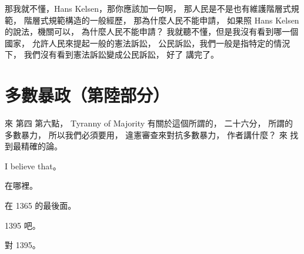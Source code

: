 \hypertarget{w06:cue:2940}{}那我就不懂，Hans Kelsen，那你應該加一句啊，
\hypertarget{w06:cue:2941}{}那人民是不是也有維護階層式規範，
\hypertarget{w06:cue:2942}{}階層式規範構造的一般經歷，
\hypertarget{w06:cue:2943}{}那為什麼人民不能申請，
\hypertarget{w06:cue:2944}{}如果照 Hans Kelsen 的說法，機關可以，
\hypertarget{w06:cue:2945}{}為什麼人民不能申請？
\hypertarget{w06:cue:2946}{}我就聽不懂，但是我沒有看到哪一個國家，
\hypertarget{w06:cue:2947}{}允許人民來提起一般的憲法訴訟，
\hypertarget{w06:cue:2948}{}公民訴訟，我們一般是指特定的情況下，
\hypertarget{w06:cue:2949}{}我們沒有看到憲法訴訟變成公民訴訟，
\hypertarget{w06:cue:2950}{}好了 講完了。

\section{多數暴政（第陸部分）}

\hypertarget{w06:cue:2951}{}來 第四 第六點，
\hypertarget{w06:cue:2952}{}Tyranny of Majority
\hypertarget{w06:cue:2953}{}有關於這個所謂的，
\hypertarget{w06:cue:2954}{}二十六分，
\hypertarget{w06:cue:2955}{}所謂的多數暴力，
\hypertarget{w06:cue:2956}{}所以我們必須要用，
\hypertarget{w06:cue:2957}{}違憲審查來對抗多數暴力，
\hypertarget{w06:cue:2958}{}作者講什麼？
\hypertarget{w06:cue:2959}{}來 找到最精確的論。

\hypertarget{w06:cue:2960}{}I believe that。

\hypertarget{w06:cue:2961}{}在哪裡。

\hypertarget{w06:cue:2962}{}在 1365 的最後面。

\hypertarget{w06:cue:2963}{}1395 吧。

\hypertarget{w06:cue:2964}{}對 1395。

